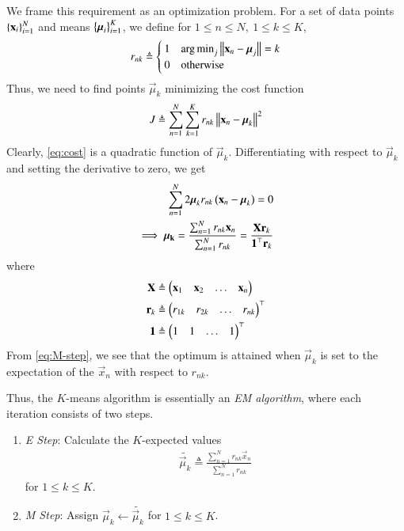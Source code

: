 \documentclass[conference]{IEEEtran}
\DeclareMathOperator*{\argmin}{arg\,min}
\begin{document}
We frame this requirement as an optimization problem. For a set of data points 
$\left\{\boldsymbol{\mathbf{x}}_i\right\}_{i=1}^N$ and means $\left\{\boldsymbol{\mathbf{\mu}}_i\right\}_{i=1}^K$, we define
for $1 \le n \le N,\ 1 \le k \le K$,
\begin{align}
    r_{nk} \triangleq
    \begin{cases}
        1 & \argmin_{j}\norm{\vec{x}_n-\vec{\mu}_j} = k \\
        0 & \textrm{otherwise}
    \end{cases}
    \label{eq:rnk-def}
\end{align}
Thus, we need to find points $\vec{\mu}_k$ minimizing the cost function
\begin{align}
    J \triangleq \sum_{n=1}^N\sum_{k=1}^Kr_{nk}\left\lVert\boldsymbol{\mathbf{x}}_n-\boldsymbol{\mathbf{\mu}}_k\right\rVert^2
    \label{eq:cost}
\end{align}
Clearly, \eqref{eq:cost} is a quadratic function of $\vec{\mu}_k$.
Differentiating with respect to $\vec{\mu}_k$ and setting the derivative
to zero, we get
\begin{align}
    \sum_{n=1}^N2\boldsymbol{\mathbf{\mu}}_kr_{nk}\left(\boldsymbol{\mathbf{x}}_n-\boldsymbol{\mathbf{\mu}}_k\right) = 0 \\
    \implies \boldsymbol{\mathbf{{\mu_k}}} = \frac{\sum_{n=1}^Nr_{nk}\boldsymbol{\mathbf{x}}_n}{\sum_{n=1}^Nr_{nk}} = \frac{\boldsymbol{\mathbf{Xr}}_k}{\boldsymbol{\mathbf{1}}^\top\boldsymbol{\mathbf{r}}_k}
    \label{eq:M-step}
\end{align}
where
\begin{align}
    \boldsymbol{\mathbf{X}} &\triangleq \begin{pmatrix}\boldsymbol{\mathbf{x}}_1&\boldsymbol{\mathbf{x}}_2&\ldots&\boldsymbol{\mathbf{x}}_n\end{pmatrix} \\
    \boldsymbol{\mathbf{r}}_k &\triangleq \begin{pmatrix}r_{1k}&r_{2k}&\ldots&r_{nk}\end{pmatrix}^\top \\
    \boldsymbol{\mathbf{1}} &\triangleq \begin{pmatrix}1&1&\ldots&1\end{pmatrix}^\top
    \label{eq:M-defs}
\end{align}
From \eqref{eq:M-step}, we see that the optimum is attained when $\vec{\mu}_k$ 
is set to the expectation of the $\vec{x}_n$ with respect to $r_{nk}$.

Thus, the $K$-means algorithm is essentially an \textit{EM algorithm}, where 
each iteration consists of two steps.
\begin{enumerate}
    \item \textit{E Step}: Calculate the $K$-expected values
    \begin{align}
        \tilde{\vec{\mu}_k} \triangleq \frac{\sum_{n=1}^Nr_{nk}\vec{x}_n}{\sum_{n=1}^Nr_{nk}}
        \label{eq:E-step}
    \end{align}
    for $1 \le k \le K$.
    \item \textit{M Step}: Assign $\vec{\mu}_k \leftarrow \tilde{\vec{\mu}_k}$
    for $1 \le k \le K$.
\end{enumerate}
\end{document}

